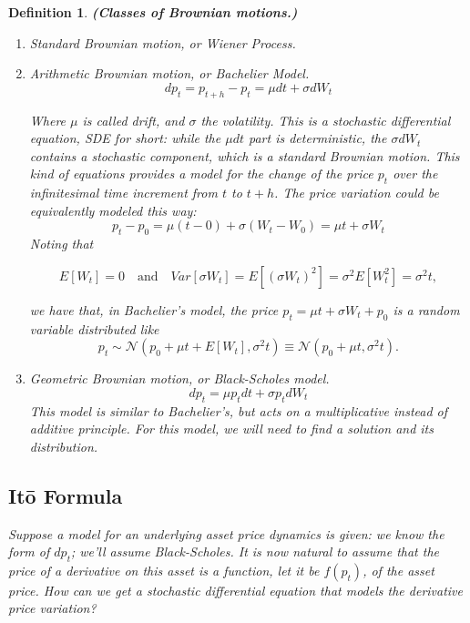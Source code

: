 \documentclass[oneside,titlepage,headinclude,12pt,a4paper,BCOR5mm,footinclude]{book}
\theoremstyle{defn}
\newtheorem{defn}{Definition}
\begin{document}
  \begin{defn}\textbf{(Classes of Brownian motions.)}

  \begin{enumerate}[label=(\Roman*)]
    \item \textit{Standard Brownian motion}, or \textit{Wiener Process}.
    \item \textit{Arithmetic Brownian motion}, or \textit{Bachelier Model}.
      \[
        dp_t = p_{t+h} - p_t = \mu dt + \sigma dW_t
      \]

      Where    $\mu$    is    called   \textit{drift},    and    $\sigma$    the
      \textit{volatility}. This is  a \textit{stochastic differential equation},
      \textit{SDE} for short: while the $\mu dt$ part is \textit{deterministic},
      the $\sigma  dW_t$ contains  a \textit{stochastic}  component, which  is a
      standard Brownian motion. This kind of  equations provides a model for the
      change of the  price $p_t$ over the infinitesimal time  increment from $t$
      to $t+h$. The price variation could be equivalently modeled this way:
      \[
        p_t - p_0 = \mu(t-0) + \sigma(W_t - W_0) = \mu t + \sigma W_t
      \]
      Noting that 

      \[ 
        E[W_t]  =  0
        \quad \text{and} \quad
        Var[\sigma W_t]  =  E[(\sigma W_t)^2]  = \sigma^2 E[W_t^2] =  \sigma^2 t,
      \]

      we have that, in Bachelier's model, the price  $p_t = \mu t + \sigma W_t +
      p_0$ is a \textit{random variable} distributed like
      \[
        p_t \sim \mathcal{N}(p_0 + \mu t + E[W_t], \sigma^2 t) \equiv
          \mathcal{N}(p_0 + \mu t, \sigma^2 t).
      \]

    \item \textit{Geometric Brownian motion}, or \textit{Black-Scholes model}.
      \[
        dp_t = \mu p_t dt + \sigma p_t dW_t
      \]
      This model is similar to Bachelier's, but acts on a multiplicative instead
      of additive principle. For this model, we will need to find a solution and
      its distribution.

  \end{enumerate}

  \subsection{It\=o Formula}

  Suppose a model for  an underlying asset price dynamics is  given: we know the
  form of $dp_t$;  we'll assume Black-Scholes. It is now  natural to assume that
  the price  of a  derivative on this  asset is a  \textit{function}, let  it be
  $f(p_t)$, of the asset price. How can we get a \textit{stochastic differential
  equation} that models the derivative price variation?


\end{defn}
\end{document}
